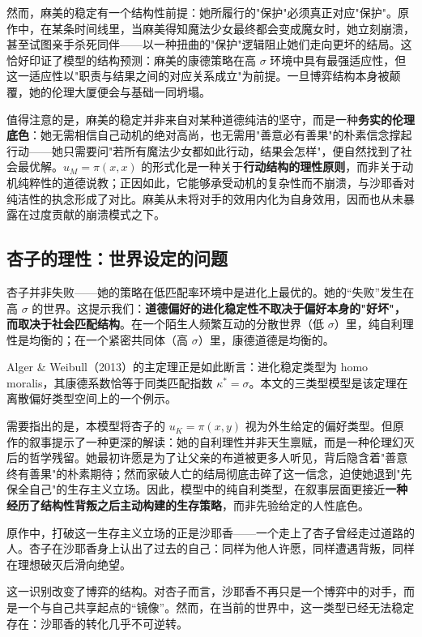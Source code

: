 \documentclass[12pt]{article}
\begin{document}
然而，麻美的稳定有一个结构性前提：她所履行的"保护"必须真正对应"保护"。原作中，在某条时间线里，当麻美得知魔法少女最终都会变成魔女时，她立刻崩溃，甚至试图亲手杀死同伴——以一种扭曲的"保护"逻辑阻止她们走向更坏的结局。这恰好印证了模型的结构预测：麻美的康德策略在高 $\sigma$ 环境中具有最强适应性，但这一适应性以"职责与结果之间的对应关系成立"为前提。一旦博弈结构本身被颠覆，她的伦理大厦便会与基础一同坍塌。

值得注意的是，麻美的稳定并非来自对某种道德纯洁的坚守，而是一种\textbf{务实的伦理底色}：她无需相信自己动机的绝对高尚，也无需用"善意必有善果"的朴素信念撑起行动——她只需要问"若所有魔法少女都如此行动，结果会怎样"，便自然找到了社会最优解。$u_M = \pi(x,x)$ 的形式化是一种关于\textbf{行动结构的理性原则}，而非关于动机纯粹性的道德说教；正因如此，它能够承受动机的复杂性而不崩溃，与沙耶香对纯洁性的执念形成了对比。麻美从未将对手的效用内化为自身效用，因而也从未暴露在过度贡献的崩溃模式之下。

\subsection{杏子的理性：世界设定的问题}

杏子并非失败——她的策略在低匹配率环境中是进化上最优的。她的“失败”发生在高 $\sigma$ 的世界。这提示我们：\textbf{道德偏好的进化稳定性不取决于偏好本身的"好坏"，而取决于社会匹配结构}。在一个陌生人频繁互动的分散世界（低 $\sigma$）里，纯自利理性是均衡的；在一个紧密共同体（高 $\sigma$）里，康德道德是均衡的。

Alger \& Weibull（2013）的主定理正是如此断言：进化稳定类型为 homo moralis，其康德系数恰等于同类匹配指数 $\kappa^* = \sigma$。本文的三类型模型是该定理在离散偏好类型空间上的一个例示。

需要指出的是，本模型将杏子的 $u_K = \pi(x,y)$ 视为外生给定的偏好类型。但原作的叙事提示了一种更深的解读：她的自利理性并非天生禀赋，而是一种伦理幻灭后的哲学残留。她最初许愿是为了让父亲的布道被更多人听见，背后隐含着"善意终有善果"的朴素期待；然而家破人亡的结局彻底击碎了这一信念，迫使她退到"先保全自己"的生存主义立场。因此，模型中的纯自利类型，在叙事层面更接近\textbf{一种经历了结构性背叛之后主动构建的生存策略}，而非先验给定的人性底色。

原作中，打破这一生存主义立场的正是沙耶香——一个走上了杏子曾经走过道路的人。杏子在沙耶香身上认出了过去的自己：同样为他人许愿，同样遭遇背叛，同样在理想破灭后滑向绝望。

这一识别改变了博弈的结构。对杏子而言，沙耶香不再只是一个博弈中的对手，而是一个与自己共享起点的“镜像”。然而，在当前的世界中，这一类型已经无法稳定存在：沙耶香的转化几乎不可逆转。
\end{document}
